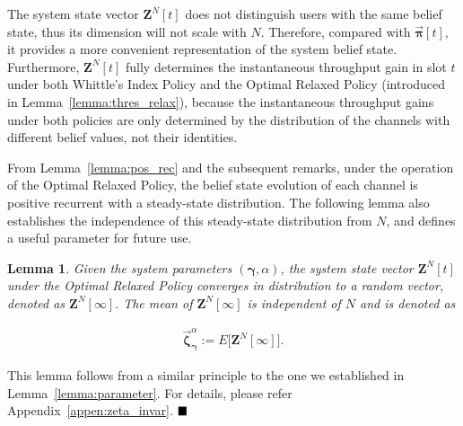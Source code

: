 \documentclass[11pt,twocolumn]{IEEEtran}
\newtheorem{lemma}{Lemma}
\begin{document}
The system state vector ${\bm Z}^N[t]$ does not distinguish
users with the same belief state, thus its dimension will not scale
with $N$. Therefore, compared with $\vec{\bm \pi}[t]$, it provides a
more convenient representation of the system belief state.
Furthermore, ${\bm Z}^N[t]$ fully determines the instantaneous
throughput gain in slot $t$ under both Whittle's Index Policy
and the Optimal Relaxed Policy (introduced in
Lemma~\ref{lemma:thres_relax}), because the instantaneous
throughput gains under both policies are only determined by the
distribution of the channels with different belief values, not their
identities.



From Lemma~\ref{lemma:pos_rec} and the subsequent remarks,
under the operation of the Optimal Relaxed Policy, the belief state
evolution of each channel is positive recurrent with a steady-state
distribution. The following lemma also establishes the independence
of this steady-state distribution from $N$, and defines a useful
parameter for future use.







\begin{lemma}\label{lemma:zeta_invar}
Given the system parameters $(\bm \gamma, \alpha)$, the system state
vector ${\bm Z}^N[t]$ under the Optimal Relaxed Policy converges
in distribution to a random vector, denoted as ${\bm
Z}^N[\infty].$ The mean of ${\bm Z}^N[\infty]$ is
independent of $N$ and is denoted as

\vspace{-18pt}
\begin{align}
\vec{\bm \zeta}^{\alpha}_{\bm \gamma}{:=} E\big[{\bm
Z}^N[\infty]\big]. \nonumber
\end{align}
\end{lemma}

 This lemma follows from a similar
principle to the one we established in Lemma~\ref{lemma:parameter}.
For details, please refer Appendix~\ref{appen:zeta_invar}.
\hspace{2in} $\hfill \blacksquare$
\end{document}
